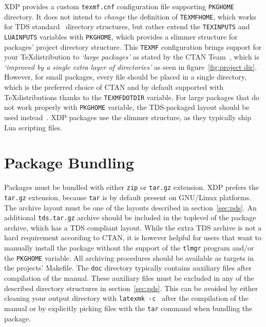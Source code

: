 \documentclass{xdpdoc}
\begin{document}
    XDP provides a custom \texttt{texmf.cnf} configuration file supporting \texttt{PKGHOME} directory.
    It does not intend to \textit{change} the definition of \texttt{TEXMFHOME}, which works for TDS standard~\cite{tds} directory structures, but rather extend the \texttt{TEXINPUTS} and \texttt{LUAINPUTS} variables with \texttt{PKGHOME}, which provides a slimmer structure for packages' project directory structure.
    This \texttt{TEXMF} configuration brings support for your \TeX distribution to \textit{`large packages'} as stated by the CTAN Team~\cite{ctan:help:upload}, which is \textit{`improved by a single extra layer of directories'} as seen in figure~\ref{fig:project dir}.
    However, for small packages, every file should be placed in a single directory, which is the preferred choice of CTAN and by default supported with \TeX distributions thanks to the \texttt{TEXMFDOTDIR} variable.
    For large packages that do not work properly with \texttt{PKGHOME} variable, the TDS-packaged layout should be used instead~\cite{ctan:help:tds}.
    XDP packages use the slimmer structure, as they typically ship Lua scripting files.

    \section{Package Bundling}\label{sec:bundling}

    Packages must be bundled with either \texttt{zip} or \texttt{tar.gz} extension.
    XDP prefers the \texttt{tar.gz} extension, because \texttt{tar} is by default present on GNU/Linux platforms.
    The archive layout must be one of the layouts described in section~\ref{sec:pds}.
    An additional \texttt{tds.tar.gz} archive should be included in the toplevel of the package archive, which has a TDS compliant layout.
    While the extra TDS archive is not a hard requirement according to CTAN, it is however helpful for users that want to manually install the package without the support of the \texttt{tlmgr} program and/or the \texttt{PKGHOME} variable.
    All archiving procedures should be available as targets in the projects' Makefile.
    The \texttt{doc} directory typically contains auxiliary files after compilation of the manual.
    These auxiliary files must be excluded in any of the described directory structures in section~\ref{sec:pds}.
    This can be avoided by either cleaning your output directory with \texttt{latexmk -c } after the compilation of the manual or by explicitly picking files with the \texttt{tar} command when bundling the package.
\end{document}
